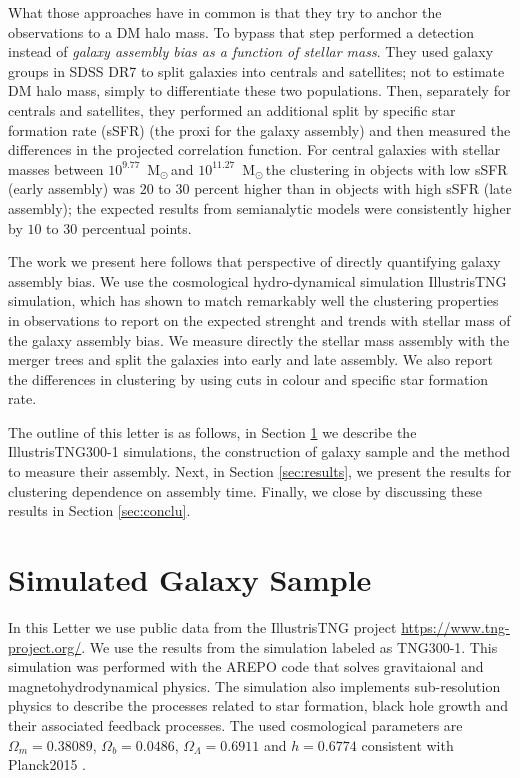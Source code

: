 \documentclass[fleqn,usenatbib]{mnras}
\newcommand{\Msun}{\,{\rm M}$_{\odot}$\,}
\begin{document}
What those approaches have in common is that they try to anchor the
observations to a DM halo mass. 
To bypass that step \citet{2013MNRAS.433..515W} performed a detection
instead of \emph{galaxy assembly bias as a function of stellar mass}.
They used galaxy groups in SDSS DR7 to split galaxies into centrals
and satellites; not to estimate DM halo mass, simply to differentiate
these two populations.
Then, separately for centrals and satellites, they performed an additional
split by specific star formation rate (sSFR) (the proxi for the galaxy
assembly) and then measured the differences in the projected correlation function.
For central galaxies with stellar masses between $10^{9.77}$ \Msun and
$10^{11.27}$ \Msun the clustering in objects with low sSFR (early
assembly) was $20$ to $30$ percent higher than in objects with high
sSFR (late assembly); the expected results from semianalytic models
were consistently higher by $10$ to $30$ percentual points. 


The work we present here follows that perspective of directly
quantifying galaxy assembly bias.
We use the cosmological hydro-dynamical simulation IllustrisTNG simulation,
which has shown to match remarkably well the clustering properties in
observations \citep{2018MNRAS.475..676S} to report on the expected
strenght and trends with stellar mass of the galaxy assembly bias.
We measure directly the stellar mass assembly with the merger trees
and split the galaxies into early and late assembly.
We also report the differences in clustering by using cuts in colour
and specific star formation rate.


The outline of this letter is as follows, in Section \ref{sec:simul}
we describe the IllustrisTNG300-1 simulations, the construction of
galaxy sample and the method to measure their assembly.
Next, in Section \ref{sec:results}, we present the results for
clustering dependence on assembly time.
Finally, we close by discussing these results in Section \ref{sec:conclu}. 


\section{Simulated Galaxy Sample}
\label{sec:simul} %

In this Letter we use public data from the IllustrisTNG project
\url{https://www.tng-project.org/}. 
We use the results from the simulation labeled as TNG300-1.
This simulation was performed with the AREPO code
\citep{2018MNRAS.473.4077P} that solves gravitaional and
magnetohydrodynamical physics.
The simulation also implements sub-resolution physics to describe the
processes related to star formation, black hole growth and their
associated feedback processes.
The used cosmological parameters are $\Omega_m=0.38089$,
$\Omega_b=0.0486$, $\Omega_\Lambda= 0.6911$ and $h=0.6774$ consistent
with Planck2015 \citep{2016A&A...594A..13P}. 
\end{document}
